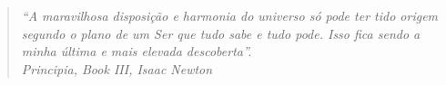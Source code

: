 


\vspace*{\fill}
\begin{quote}

\raggedleft

\textit{``A maravilhosa disposição e harmonia do universo só pode ter tido origem segundo o plano de um Ser que tudo sabe e tudo pode. Isso fica sendo a minha última e mais elevada descoberta''. \vspace{10pt} \\ Principia, Book III, Isaac Newton }

\vspace{10pt}


\end{quote}

